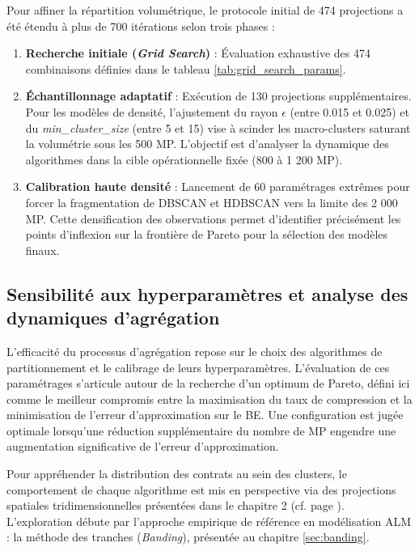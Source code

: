 Pour affiner la répartition volumétrique, le protocole initial de 474 projections a été étendu à plus de 700 itérations selon trois phases :
\begin{enumerate}
    \item \textbf{Recherche initiale (\textit{Grid Search})} : Évaluation exhaustive des 474 combinaisons définies dans le tableau \ref{tab:grid_search_params}.
    \item \textbf{Échantillonnage adaptatif} : Exécution de 130 projections supplémentaires. Pour les modèles de densité, l'ajustement du rayon $\epsilon$ (entre 0.015 et 0.025) et du \textit{min\_cluster\_size} (entre 5 et 15) vise à scinder les macro-clusters saturant la volumétrie sous les 500 MP. L'objectif est d'analyser la dynamique des algorithmes dans la cible opérationnelle fixée (800 à 1 200 MP). 
    \item \textbf{Calibration haute densité} : Lancement de 60 paramétrages extrêmes pour forcer la fragmentation de DBSCAN et HDBSCAN vers la limite des 2 000 MP. Cette densification des observations permet d'identifier précisément les points d'inflexion sur la frontière de Pareto pour la sélection des modèles finaux.
\end{enumerate}

\subsection{Sensibilité aux hyperparamètres et analyse des dynamiques d'agrégation}
\label{subsec:sensi_hyperparam}

L'efficacité du processus d'agrégation repose sur le choix des algorithmes de partitionnement et le calibrage de leurs hyperparamètres. L'évaluation de ces paramétrages s'articule autour de la recherche d'un optimum de Pareto, défini ici comme le meilleur compromis entre la maximisation du taux de compression et la minimisation de l'erreur d'approximation sur le BE. Une configuration est jugée optimale lorsqu'une réduction supplémentaire du nombre de MP engendre une augmentation significative de l'erreur d'approximation.

Pour appréhender la distribution des contrats au sein des clusters, le comportement de chaque algorithme est mis en perspective via des projections spatiales tridimensionnelles présentées dans le chapitre 2 (cf. page \pageref{expl:graph_3d}). L'exploration débute par l'approche empirique de référence en modélisation ALM : la méthode des tranches (\textit{Banding}), présentée au chapitre \ref{sec:banding}.

